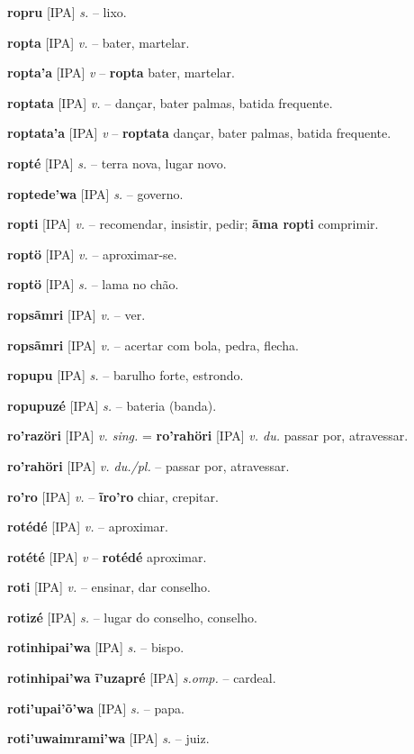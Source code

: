 \textbf{ropru} [IPA] \textit{s.} -- lixo.

\textbf{ropta} [IPA] \textit{v.} -- bater, martelar.

\textbf{ropta'a} [IPA] \textit{v} -- \textbf{ropta} bater, martelar.

\textbf{roptata} [IPA] \textit{v.} -- dançar, bater palmas, batida frequente.

\textbf{roptata'a} [IPA] \textit{v} -- \textbf{roptata} dançar, bater palmas, batida frequente.

\textbf{ropté} [IPA] \textit{s.} -- terra nova, lugar novo.

\textbf{roptede'wa} [IPA] \textit{s.} -- governo.

\textbf{ropti} [IPA] \textit{v.} -- recomendar, insistir, pedir; \textbf{ãma ropti} comprimir.

\textbf{roptö} [IPA] \textit{v.} -- aproximar-se.

\textbf{roptö} [IPA] \textit{s.} -- lama no chão.

\textbf{ropsãmri} [IPA] \textit{v.} -- ver.

\textbf{ropsãmri} [IPA] \textit{v.} -- acertar com bola, pedra, flecha.

\textbf{ropupu} [IPA] \textit{s.} -- barulho forte, estrondo.

\textbf{ropupuzé} [IPA] \textit{s.} -- bateria (banda).

\textbf{ro'razöri} [IPA] \textit{v. sing.} = \textbf{ro'rahöri} [IPA] \textit{v. du.} passar por, atravessar.

\textbf{ro'rahöri} [IPA] \textit{v. du./pl.} -- passar por, atravessar.

\textbf{ro'ro} [IPA] \textit{v.} -- \textbf{ĩro'ro} chiar, crepitar.

\textbf{rotédé} [IPA] \textit{v.} -- aproximar.

\textbf{rotété} [IPA] \textit{v} -- \textbf{rotédé} aproximar.

\textbf{roti} [IPA] \textit{v.} -- ensinar, dar conselho.

\textbf{rotizé} [IPA] \textit{s.} -- lugar do conselho, conselho.

\textbf{rotinhipai'wa} [IPA] \textit{s.} -- bispo.

\textbf{rotinhipai'wa ĩ'uzapré} [IPA] \textit{s.omp.} -- cardeal.

\textbf{roti'upai'õ'wa} [IPA] \textit{s.} -- papa.

\textbf{roti'uwaimrami'wa} [IPA] \textit{s.} -- juiz.

